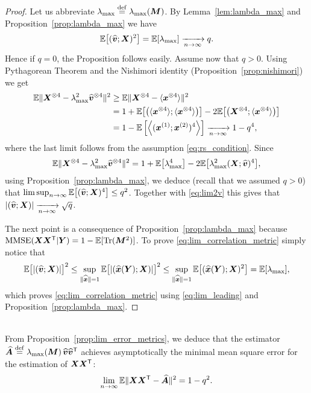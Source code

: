 \documentclass[12pt,nocut]{article}
\begin{document}
\begin{proof}
	Let us abbreviate $\lambda_{\rm max} \overset{{\rm def}}{=} \lambda_{\rm max}({\boldsymbol M})$.
	By Lemma~\ref{lem:lambda_max}  and Proposition~\ref{prop:lambda_max} we have
	\begin{equation}\label{eq:lim2v}
	\mathbb{E}\big[(\widehat{{\boldsymbol v}}; {\boldsymbol X})^2\big] = \mathbb{E}[\lambda_{\rm max}] \xrightarrow[n \to \infty]{} q.
	\end{equation}
	Hence if $q=0$, the Proposition follows easily. Assume now that $q > 0$.
	Using Pythagorean Theorem and the Nishimori identity (Proposition~\ref{prop:nishimori}) we get
	\begin{align*}
		\mathbb{E} \| {\boldsymbol X}^{\otimes 4} - \lambda_{\rm max}^2 \widehat{{\boldsymbol v}}^{\otimes 4} \|^2
		&\geq
		\mathbb{E} \| {\boldsymbol X}^{\otimes 4} - \langle {\boldsymbol x}^{\otimes 4}\rangle \|^2
		\\
		&=
		1 + \mathbb{E} \big[ \big( \langle {\boldsymbol x}^{\otimes 4}\rangle ; \langle {\boldsymbol x}^{\otimes 4}\rangle \big) \big]
		- 2 \mathbb{E} \big[\big( {\boldsymbol X}^{\otimes 4} ; \langle {\boldsymbol x}^{\otimes 4}\rangle\big) \big]
		\\
		&= 1 - \mathbb{E} \left[ \left\langle ({\boldsymbol x}^{(1)}; {\boldsymbol x}^{(2)})^4 \right\rangle \right]
		\xrightarrow[n \to \infty]{} 1 - q^4,
	\end{align*}
	where the last limit follows from the assumption \eqref{eq:rs_condition}. Since
	$$
		\mathbb{E} \| {\boldsymbol X}^{\otimes 4} - \lambda_{\rm max}^2 \widehat{{\boldsymbol v}}^{\otimes 4} \|^2
		= 1 + \mathbb{E}\big[\lambda_{\rm max}^4\big] - 2 \mathbb{E}\big[\lambda_{\rm max}^2 ({\boldsymbol X};\widehat{{\boldsymbol v}})^4\big],
	$$
	using Proposition~\ref{prop:lambda_max}, we deduce (recall that we assumed $q >0$) that $\limsup_{n \to \infty} \mathbb{E}\big[(\widehat{{\boldsymbol v}}; {\boldsymbol X})^4\big] \leq q^2$. Together with \eqref{eq:lim2v} this gives that $|(\widehat{{\boldsymbol v}}; {\boldsymbol X})| \xrightarrow[n \to \infty]{} \sqrt{q}$.

	The next point is a consequence of Proposition~\ref{prop:lambda_max} because
	${{\rm MMSE}}({\boldsymbol X}{\boldsymbol X}^{{\sf T}}|{\boldsymbol Y}) = 1 - \mathbb{E} [{{\rm Tr}}({\boldsymbol M}^2)]$. To prove \eqref{eq:lim_correlation_metric} simply notice that
	$$
	\mathbb{E}\big[|(\widehat{{\boldsymbol v}};{\boldsymbol X})|\big]^2
	\leq \sup_{\|\widehat{{\boldsymbol x}}\| = 1} \mathbb{E}\big[|(\widehat{{\boldsymbol x}}({\boldsymbol Y}); {\boldsymbol X})|\big]^2
	\leq
	\sup_{\|\widehat{{\boldsymbol x}}\| = 1} \mathbb{E}\big[(\widehat{{\boldsymbol x}}({\boldsymbol Y}); {\boldsymbol X})^2\big] = 
	\mathbb{E}[\lambda_{\rm max}],
	$$
	which proves \eqref{eq:lim_correlation_metric} using \eqref{eq:lim_leading} and Proposition~\ref{prop:lambda_max}. 
\end{proof}
\\

From Proposition~\ref{prop:lim_error_metrics}, we deduce that the estimator $\widehat{{\boldsymbol A}} \overset{{\rm def}}{=} \lambda_{\rm max}({\boldsymbol M}) \, \widehat{{\boldsymbol v}}\widehat{{\boldsymbol v}}^{{\sf T}}$ achieves asymptotically the minimal mean square error for the estimation of ${\boldsymbol X}{\boldsymbol X}^{{\sf T}}$:
$$
\lim_{n \to \infty} \mathbb{E} \| {\boldsymbol X} {\boldsymbol X}^{{\sf T}} - \widehat{{\boldsymbol A}} \|^2 = 1-q^2.
$$
\end{document}
